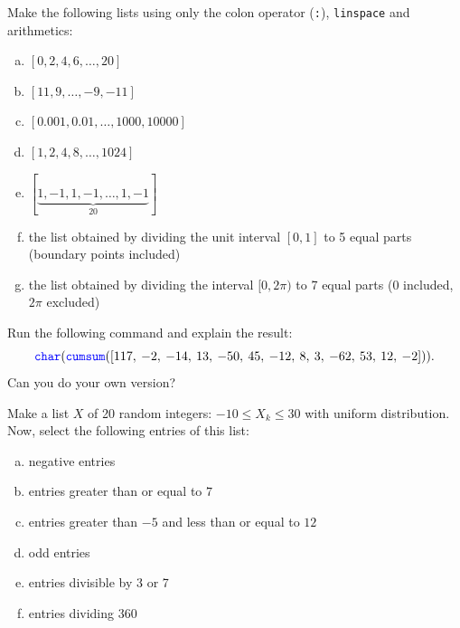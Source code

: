 \documentclass[a4paper, fleqn, 10pt]{report}
\theoremstyle{definition}
\newenvironment{prb*}[1]
  {\renewcommand\theprb{\thechapter.\arabic{prb}\rlap{$^{#1}$}}\prb}
  {\endprb}
\newcommand{\mc}[1]{{\color{Blue}\tt #1}}
\begin{document}
\begin{prb*}{2}
Make the following lists using only the colon operator (\mc{:}), \mc{linspace} and arithmetics:
\begin{multicols}{2}
\begin{enumerate}[a)]
 \item $[0, 2, 4, 6, \dots, 20]$
 \item $[11, 9, \dots, -9, -11]$
 \item $[0.001, 0.01, \dots, 1000, 10000]$
 \item $[1, 2, 4, 8, \dots, 1024]$
 \item $[\underbrace{1,-1,1,-1,\dots, 1,-1}_{20}]$
 \item the list obtained by dividing the unit interval $[0, 1]$ to 5 equal parts (boundary points included) 
 \item the list obtained by dividing the interval $[0, 2\pi)$ to 7 equal parts ($0$ included, $2\pi$ excluded) 
\end{enumerate}
\end{multicols}
\end{prb*}

\begin{prb*}{1}
Run the following command and explain the result:  
\[\mathrm{\mc{char}}(\mathrm{\mc{cumsum}}([117,\:-2,\:-14,\:13,\:-50,\:45,\:-12,\:8,\:3,\:-62,\:53,\:12,\:-2])).\]
Can you do your own version?
\end{prb*}

\begin{prb*}{2}
Make a list $X$ of 20 random integers: $-10\le X_k\le 30$ with uniform distribution.
Now, select the following entries of this list:
\begin{multicols}{2}
\begin{enumerate}[a)]
 \item negative entries
 \item entries greater than or equal to $7$
 \item entries greater than $-5$ and less than or equal to $12$
 \item odd entries
 \item entries divisible by 3 or 7
 \item entries dividing 360
\end{enumerate}
\end{multicols}
\end{prb*}
\end{document}
